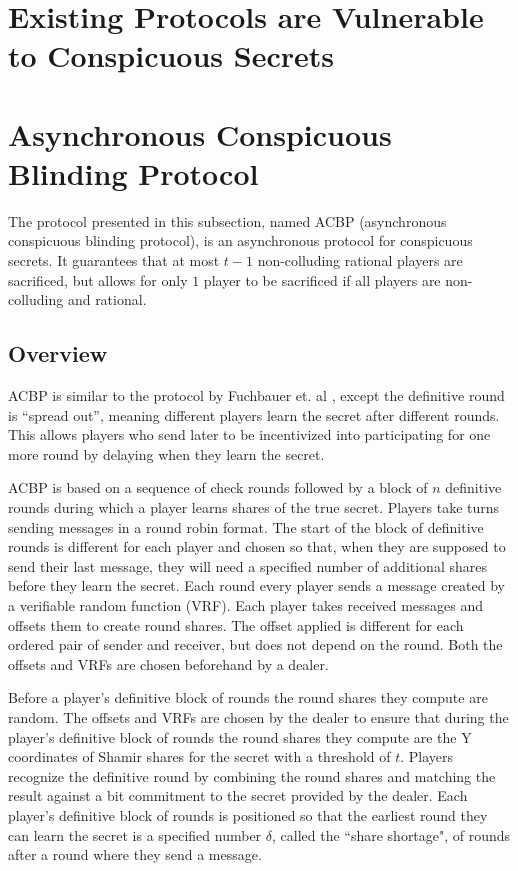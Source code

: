 \documentclass[12pt]{article}
\begin{document}
\section{Existing Protocols are Vulnerable to Conspicuous Secrets}

\section{Asynchronous Conspicuous Blinding Protocol}
\label{Sec:ACBP}

The protocol presented in this subsection, named ACBP (asynchronous conspicuous blinding protocol), is an asynchronous protocol for conspicuous secrets. It guarantees that at most $t-1$ non-colluding rational players are sacrificed, but allows for only $1$ player to be sacrificed if all players are non-colluding and rational.

\subsection{Overview}

ACBP is similar to the protocol by Fuchbauer et. al \cite{fuch10}, except the definitive round is ``spread out'', meaning different players learn the secret after different rounds. This allows players who send later to be incentivized into participating for one more round by delaying when they learn the secret.
 
ACBP is based on a sequence of check rounds followed by a block of $n$ definitive rounds during which a player learns shares of the true secret. Players take turns sending messages in a round robin format. The start of the block of definitive rounds is different for each player and chosen so that, when they are supposed to send their last message, they will need a specified number of additional shares before they learn the secret. Each round every player sends a message created by a verifiable random function (VRF). Each player takes received messages and offsets them to create round shares. The offset applied is different for each ordered pair of sender and receiver, but does not depend on the round. Both the offsets and VRFs are chosen beforehand by a dealer.

Before a player's definitive block of rounds the round shares they compute are random. The offsets and VRFs are chosen by the dealer to ensure that during the player's definitive block of rounds the round shares they compute are the Y coordinates of Shamir shares for the secret with a threshold of $t$. Players recognize the definitive round by combining the round shares and matching the result against a bit commitment to the secret provided by the dealer. Each player's definitive block of rounds is positioned so that the earliest round they can learn the secret is a specified number $\delta$, called the ``share shortage", of rounds after a round where they send a message.
\end{document}

